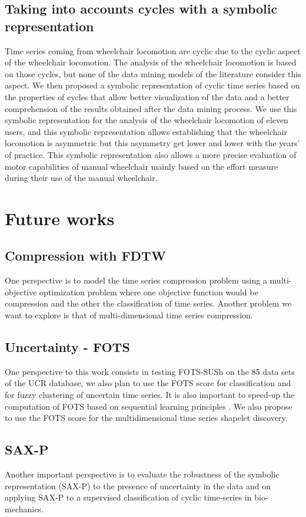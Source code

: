 \subsection*{Taking into accounts cycles with a symbolic representation}
Time series coming from wheelchair locomotion are cyclic due to the cyclic aspect of the wheelchair locomotion. The analysis of the wheelchair locomotion is based on those cycles, but none of the data mining models of the literature consider this aspect. We then proposed a symbolic representation of cyclic time series based on the properties of cycles that allow better visualization of the data and a better comprehension of the results obtained after the data mining process. We use this symbolic representation for the analysis of the wheelchair locomotion of eleven users, and this symbolic representation allows establishing that the wheelchair locomotion is asymmetric but this asymmetry get lower and lower with the years' of practice. This symbolic representation also allows a more precise evaluation of motor capabilities of manual wheelchair mainly based on the effort measure during their use of the manual wheelchair.
\section*{Future works}

\subsection*{Compression with FDTW}
One perspective is to model the time series compression problem using a multi-objective optimization problem where one objective function would be compression and the other the classification of time series. Another problem we want to explore is that of multi-dimensional time series compression.


\subsection*{Uncertainty - FOTS}
One perspective to this work consists in testing FOTS-SUSh on the 85 data sets of the UCR database, we also plan to  use the FOTS score for classification and for fuzzy clustering of uncertain time series.  It is also important to speed-up the computation of FOTS based on sequential learning principles  \cite{calandriello}. We also propose to use the FOTS score for the multidimensional time series shapelet discovery.  


\subsection*{SAX-P}
Another important perspective is to evaluate the robustness of the symbolic representation (SAX-P) to the presence of uncertainty in the data and on applying SAX-P to a supervised classification of cyclic time-series in bio-mechanics.

